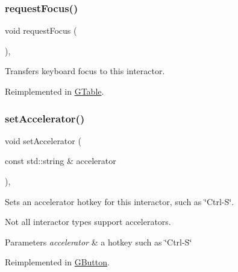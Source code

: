 \subsubsection{\texorpdfstring{request\+Focus()}{requestFocus()}}
{\footnotesize\ttfamily void request\+Focus (\begin{DoxyParamCaption}{ }\end{DoxyParamCaption})\hspace{0.3cm}{\ttfamily [virtual]}, {\ttfamily [inherited]}}



Transfers keyboard focus to this interactor. 



Reimplemented in \mbox{\hyperlink{classsgl_1_1GTable_a5921efd0a5a83eacebdadb749fb3ea7a}{G\+Table}}.

\mbox{\label{classsgl_1_1GInteractor_ad15f102f62e2960576012f1aa0ba4b2e}} 
\subsubsection{\texorpdfstring{set\+Accelerator()}{setAccelerator()}}
{\footnotesize\ttfamily void set\+Accelerator (\begin{DoxyParamCaption}\item[{const std\+::string \&}]{accelerator }\end{DoxyParamCaption})\hspace{0.3cm}{\ttfamily [virtual]}, {\ttfamily [inherited]}}



Sets an accelerator hotkey for this interactor, such as \char`\"{}\+Ctrl-\/\+S\char`\"{}. 

Not all interactor types support accelerators. 
\begin{DoxyParams}{Parameters}
{\em accelerator} & a hotkey such as \char`\"{}\+Ctrl-\/\+S\char`\"{} \\
\hline
\end{DoxyParams}


Reimplemented in \mbox{\hyperlink{classsgl_1_1GButton_a502f311e78e7531f8a7b50054ce91c85}{G\+Button}}.

\mbox{\label{classsgl_1_1GInteractor_a4b5843fe3030e038a1ba54cc03389bcf}} 
